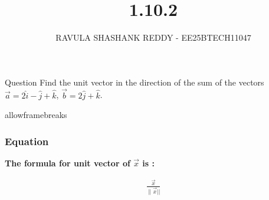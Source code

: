 \documentclass{beamer}
\title %
{1.10.2}
\author %
{RAVULA SHASHANK REDDY - EE25BTECH11047}
\begin{document}
	
	
	\frame{\titlepage}
	\begin{frame}{Question}
		Find the unit vector in the direction of the sum of the vectors
$\vec{a} = 2\hat{i} - \hat{j} + \hat{k}$, 
$\vec{b} = 2\hat{j} + \hat{k}$.\\

	\end{frame}
	\begin{frame}{allowframebreaks}
		\frametitle{Equation}
	\textbf{The formula for unit vector of $\vec{x}$ is : }
		\centering
		
		\label{tab:parameters}
		\begin{align*}
			\frac{\vec{x}}{\|\vec{x}||} 
		\end{align*}
		\end{frame}	
	
\end{document}
